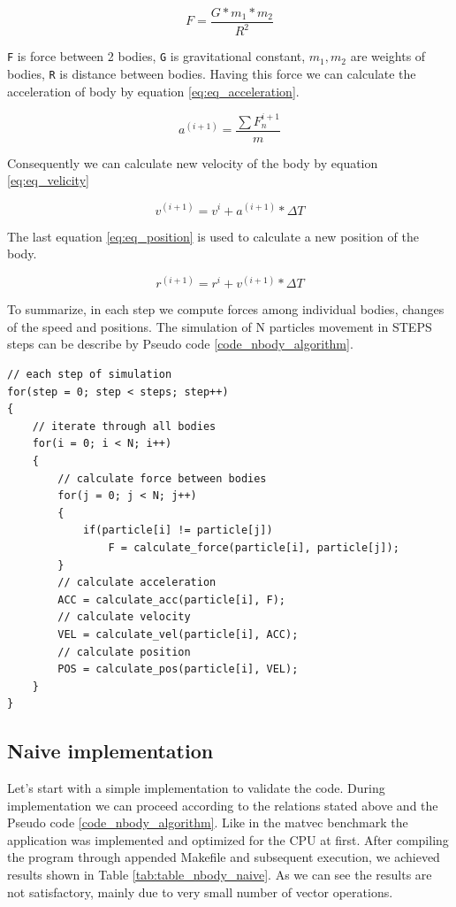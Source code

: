 \begin{equation}
F = \frac{G * m_1 * m_2}{R^2}
\label{eq:eq_force}
\end{equation}

\texttt{F} is force between 2 bodies, \texttt{G} is gravitational constant, $m_1, m_2$ are weights of bodies, \texttt{R} is distance between bodies. Having this force we can calculate the acceleration of body by equation \ref{eq:eq_acceleration}.

\begin{equation}
a^{(i+1)} = \frac{\sum{F^{i+1}_n}}{m}
\label{eq:eq_acceleration}
\end{equation}

Consequently we can calculate new velocity of the body by equation \ref{eq:eq_velicity}

\begin{equation}
v^{(i+1)} = v^i + a^{(i+1)} * \Delta T
\label{eq:eq_velicity}
\end{equation}

The last equation \ref{eq:eq_position} is used to calculate a new position of the body.

\begin{equation}
r^{(i+1)} = r^i + v^{(i+1)} * \Delta T
\label{eq:eq_position}
\end{equation}

To summarize, in each step we compute forces among individual bodies, changes of the speed and positions. The simulation of N particles movement in STEPS steps can be describe by Pseudo code \ref{code_nbody_algorithm}.

\bigskip
\begin{lstlisting}[caption=Pseudo code of the N-Body algorithm., captionpos=b, label=code_nbody_algorithm]
// each step of simulation
for(step = 0; step < steps; step++)
{
    // iterate through all bodies
    for(i = 0; i < N; i++)
    {
        // calculate force between bodies
        for(j = 0; j < N; j++)
        {
            if(particle[i] != particle[j])
                F = calculate_force(particle[i], particle[j]);
        }
        // calculate acceleration
        ACC = calculate_acc(particle[i], F);
        // calculate velocity
        VEL = calculate_vel(particle[i], ACC);
        // calculate position
        POS = calculate_pos(particle[i], VEL);
    }   
}
\end{lstlisting}
\bigskip

\subsection{Naive implementation}
Let's start with a simple implementation to validate the code. During implementation we can proceed according to the relations stated above and the Pseudo code \ref{code_nbody_algorithm}. Like in the matvec benchmark the application was implemented and optimized for the CPU at first. After compiling the program through appended Makefile and subsequent execution, we achieved results shown in Table \ref{tab:table_nbody_naive}. As we can see the results are not satisfactory, mainly due to very small number of vector operations.

